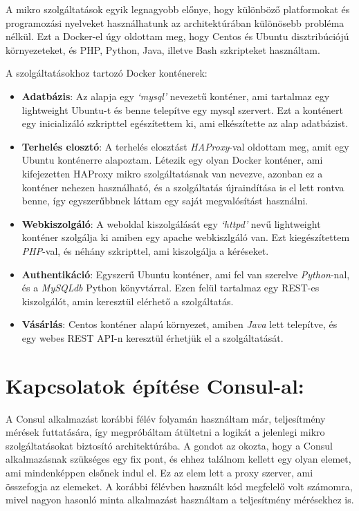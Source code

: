 \documentclass[11pt,magyar,a4paper,oneside,]{report}
\providecommand{\tightlist}{%
  \setlength{\itemsep}{0pt}\setlength{\parskip}{0pt}}
\begin{document}
A mikro szolgáltatások egyik legnagyobb előnye, hogy különböző
platformokat és programozási nyelveket használhatunk az architektúrában
különösebb probléma nélkül. Ezt a Docker-el úgy oldottam meg, hogy
Centos és Ubuntu disztribúciójú környezeteket, és PHP, Python, Java,
illetve Bash szkripteket használtam.

A szolgáltatásokhoz tartozó Docker konténerek:

\begin{itemize}
\tightlist
\item
  \textbf{Adatbázis}: Az alapja egy \emph{`mysql'} nevezetű konténer,
  ami tartalmaz egy lightweight Ubuntu-t és benne telepítve egy mysql
  szervert. Ezt a konténert egy inicializáló szkripttel egészítettem ki,
  ami elkészítette az alap adatbázist.
\item
  \textbf{Terhelés elosztó}: A terhelés elosztást \emph{HAProxy}-val
  oldottam meg, amit egy Ubuntu konténerre alapoztam. Létezik egy olyan
  Docker konténer, ami kifejezetten HAProxy mikro szolgáltatásnak van
  nevezve, azonban ez a konténer nehezen használható, és a szolgáltatás
  újraindítása is el lett rontva benne, így egyszerűbbnek láttam egy
  saját megvalósítást használni.
\item
  \textbf{Webkiszolgáló}: A weboldal kiszolgálását egy \emph{`httpd'}
  nevű lightweight konténer szolgálja ki amiben egy apache webkiszlgáló
  van. Ezt kiegészítettem \emph{PHP}-val, és néhány szkripttel, ami
  kiszolgálja a kéréseket.
\item
  \textbf{Authentikáció}: Egyszerű Ubuntu konténer, ami fel van szerelve
  \emph{Python}-nal, és a \emph{MySQLdb} Python könyvtárral. Ezen felül
  tartalmaz egy REST-es kiszolgálót, amin keresztül elérhető a
  szolgáltatás.
\item
  \textbf{Vásárlás}: Centos konténer alapú környezet, amiben \emph{Java}
  lett telepítve, és egy webes REST API-n keresztül érhetjük el a
  szolgáltatását.
\end{itemize}

\section{Kapcsolatok építése
Consul-al:}\label{kapcsolatok-uxe9puxedtuxe9se-consul-al}

A Consul alkalmazást korábbi félév folyamán használtam már, teljesítmény
mérések futtatására, így megpróbáltam átültetni a logikát a jelenlegi
mikro szolgáltatásokat biztosító architektúrába. A gondot az okozta,
hogy a Consul alkalmazásnak szükséges egy fix pont, és ehhez találnom
kellett egy olyan elemet, ami mindenképpen elsőnek indul el. Ez az elem
lett a proxy szerver, ami összefogja az elemeket. A korábbi félévben
használt kód megfelelő volt számomra, mivel nagyon hasonló minta
alkalmazást használtam a teljesítmény mérésekhez is.
\end{document}
